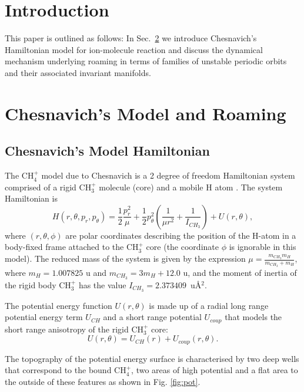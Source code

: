 \documentclass[a4paper]{article}
\begin{document}
\def \cK {\mathcal{K}}

\section{Introduction}
\label{sec:intro}

This paper is outlined as follows: In Sec.\ \ref{sec:CMR} we introduce Chesnavich's Hamiltonian model  
for ion-molecule reaction and discuss the dynamical mechanism underlying roaming in 
terms of families of unstable periodic orbits and their associated invariant manifolds.

\section{Chesnavich's Model and Roaming}
\label{sec:CMR}
\subsection{Chesnavich's Model Hamiltonian}


The  CH$_4^+$ model due to Chesnavich  is a 2 degree of freedom Hamiltonian system  
comprised of a rigid CH$_3^+$ molecule (core) and a mobile H atom \cite{Chesnavich1986}. 
The system Hamiltonian is \cite{ezra2019chesnavich}
\begin{equation}
H(r,\theta,p_r, p_\theta) = \frac{1}{2} \frac{p_r^2}{\mu} + \frac{1}{2}p_\theta^2 \left(\frac{1}{\mu r^2}+\frac{1}{I_{CH_3}}\right) + U(r,\theta),
\label{eq:chesHam}
\end{equation}
where $(r, \theta, \phi)$ are polar coordinates describing the position of the 
H-atom in a body-fixed frame attached to the CH$_3^+$ core
(the coordinate $\phi$ is ignorable in this model).  
The reduced mass of the system is given by the expression 
$\mu=\frac{m_{CH_3}m_{H}}{m_{CH_3}+m_{H}}$, where $m_{H}=1.007825$ u and $m_{CH_3}=3m_{H}+12.0$ u, 
and the moment of inertia of the rigid body CH$_3^+$ has the value  $I_{CH_3}=2.373409$~u\AA$^2$.

The potential energy function $U(r,\theta)$ is made up  of a radial long range potential
energy term $U_{CH}$ and a short range potential $U_{coup}$ that models the short range anisotropy of the rigid CH$_3^+$ core:
\begin{equation}\label{eq:U}
 U(r,\theta ) = U_{CH} (r) + U_{coup} (r,\theta).
\end{equation}

The topography of the potential energy surface  is characterised by two deep wells that 
correspond to the  bound CH$_4^+$, two areas of high potential and a flat area to the outside 
of these features as shown in Fig. \ref{fig:pot}.
\end{document}
